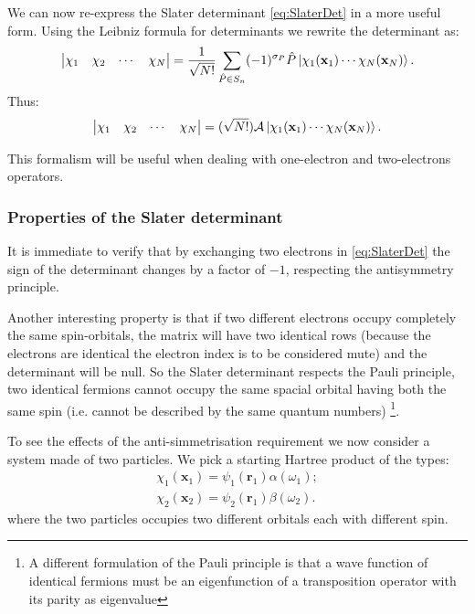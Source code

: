 \documentclass[a4paper,12pt]{article}
\begin{document}
We can now re-express the Slater determinant \eqref{eq:SlaterDet} in a more useful form. Using the Leibniz formula for determinants we rewrite the determinant as:
\begin{equation}\label{eq:SlaterLeibniz}
	\left|
	\begin{matrix}
		   \chi _1 & \chi _2 & \cdots  & \chi _N  \\
	\end{matrix} 
	\right| = \frac{1}{\sqrt{N!}} \sum_{\hat{P} \in S_n} (-1)^{\sigma_P} \hat{P} \ket{\chi_1(\mathbf{x}_1) \cdots   \chi_N(\mathbf{x}_N)}.
\end{equation}
Thus:
\begin{equation}
	\left|
	\begin{matrix}
		   \chi _1 & \chi _2 & \cdots  & \chi _N  \\
	\end{matrix} 
	\right| =  (\sqrt{N!}) \mathcal{A} \ket{ \chi_1(\mathbf{x}_1) \cdots   \chi_N(\mathbf{x}_N) }.
\end{equation}

This formalism will be useful when dealing with one-electron and two-electrons operators.

\subsubsection{Properties of the Slater determinant}\label{sec:slaterPropr}

It is immediate to verify that by exchanging two electrons in \eqref{eq:SlaterDet} the sign of the determinant changes by a factor of $- 1$, respecting the antisymmetry principle.

Another interesting property is that if two different electrons occupy completely the same spin-orbitals, the matrix will have two identical rows (because the electrons are identical the electron index is to be considered mute) and the determinant will be null. So the Slater determinant respects the Pauli principle, two identical fermions cannot occupy the same spacial orbital having both the same spin (i.e. cannot be described by the same quantum numbers) \footnote{A different formulation of the Pauli principle is that a wave function of identical fermions must be an eigenfunction of a transposition operator with its parity as eigenvalue}.


To see the effects of the anti-simmetrisation requirement we now consider a system made of two particles. We pick a starting Hartree product of the types: 
\begin{align*}
	\chi_{1}(\mathbf{x}_{1}) = \psi_{1}(\mathbf{r}_{1}) \alpha(\omega_{1});\\
	\chi_{2}(\mathbf{x}_{2}) = \psi_{2}(\mathbf{r}_{1}) \beta(\omega_{2}).
\end{align*}
where the two particles occupies two different orbitals each with different spin.
\end{document}

